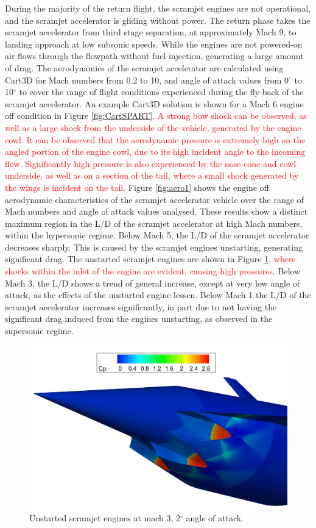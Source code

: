 During the majority of the return flight, the scramjet engines are not operational, and the scramjet accelerator is gliding without power. The return phase takes the scramjet accelerator from third stage separation, at approximately Mach 9, to landing approach at low subsonic speeds. 
 While the engines are not powered-on air flows through the flowpath without fuel injection, generating a large amount of drag. 
The aerodynamics of the scramjet accelerator are calculated using Cart3D for Mach numbers from 0.2 to 10, and angle of attack values from 0$^\circ$ to 10$^\circ$ to cover the range of flight conditions experienced during the fly-back of the scramjet accelerator.  An example Cart3D solution is shown for a Mach 6 engine off condition in Figure  \ref{fig:CartSPART}. \textcolor{red}{A strong bow shock can be observed, as well as a large shock from the underside of the vehicle, generated by the engine cowl. It can be observed that the aerodynamic pressure is extremely high on the angled portion of the engine cowl, due to its high incident angle to the incoming flow. Significantly high pressure is also experienced by the nose cone and cowl underside, as well as on a section of the tail, where a small shock generated by the wings is incident on the tail.}
Figure \ref{fig:aero1} shows the engine off aerodynamic characteristics of the scramjet accelerator vehicle over the range of Mach numbers and angle of attack values analysed.
These results show a distinct maximum region in the L/D of the scramjet accelerator at high Mach numbers, within the hypersonic regime. Below Mach 5, the L/D of the scramjet accelerator decreases sharply. This is caused by the scramjet engines unstarting, generating significant drag. The unstarted scramjet engines are shown in Figure \ref{fig:Unstart}\textcolor{red}{, where shocks within the inlet of the engine are evident, causing high pressures}. Below Mach 3,  the L/D shows a trend of general increase, except at very low angle of attack, as the effects of the unstarted engine lessen. Below Mach 1 the L/D of the scramjet accelerator increases significantly, in part due to not having the significant drag induced from the engines unstarting, as observed in the supersonic regime.  

\begin{figure}[ht]
	\centering
	\includegraphics[width=0.7\linewidth]{figures/3_vehicle_design/Unstart}
	\caption{Unstarted scramjet engines at mach 3, 2$^\circ$ angle of attack.}
	\label{fig:Unstart}
\end{figure}



